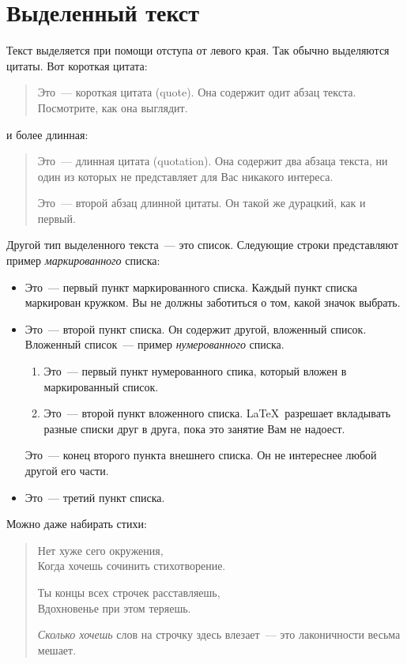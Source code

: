\documentclass{article}      %
\begin{document}
\section{Выделенный текст}

Текст выделяется при помощи отступа от левого края. Так обычно
выделяются цитаты. Вот короткая цитата:
\begin{quote}
   Это~--- короткая цитата (quote). Она содержит одит абзац
   текста. Посмотрите, как она выглядит.
\end{quote}
и более длинная:
\begin{quotation}
   Это~--- длинная цитата (quotation). Она содержит
   два абзаца текста, ни один из которых не представляет
   для Вас никакого интереса.

   Это~--- второй абзац длинной цитаты. Он такой же дурацкий,
   как и первый.
\end{quotation}
Другой тип выделенного текста~--- это список. Следующие строки
представляют пример \emph{маркированного} списка:
\begin{itemize}
   \item Это~--- первый пункт маркированного списка.
         Каждый пункт списка маркирован кружком. Вы не
         должны заботиться о том, какой значок выбрать.

   \item Это~--- второй пункт списка. Он содержит другой,
         вложенный список. Вложенный список~--- пример
         \emph{нумерованного} списка.
         \begin{enumerate}
            \item Это~--- первый пункт нумерованного спика, который
                  вложен в маркированный список.

            \item Это~--- второй пункт вложенного списка.
                  \LaTeX\ разрешает вкладывать разные списки друг
                  в друга, пока это занятие Вам не надоест.
         \end{enumerate}
         Это~--- конец второго пункта внешнего списка. Он не
         интереснее любой другой его части.
   \item Это~--- третий пункт списка.
\end{itemize}
Можно даже набирать стихи:
\begin{verse}
   Нет хуже сего окружения,\\ %
   Когда хочешь сочинить
   стихотворение.


   Ты концы всех строчек расставляешь,\\
   Вдохновенье при этом теряешь.

   \emph{Сколько хочешь} слов на строчку здесь влезает~--- это
   лаконичности весьма мешает.
\end{verse}
\end{document}
